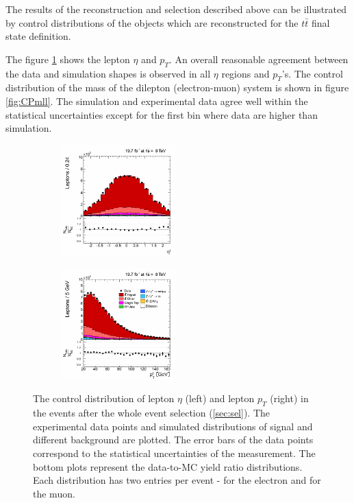 The results of the reconstruction and selection described above can be illustrated by control distributions of the objects which are reconstructed for the $t\bar{t}$
final state definition.

The figure \ref{fig:CPetaptLep} shows the lepton $\eta$ and $p_{T}$. An overall reasonable agreement between the data and simulation shapes is observed in all $\eta$ regions
and $p_{T}$'s. The control distribution of the mass of the dilepton (electron-muon) system is shown in figure \ref{fig:CPmll}. The simulation and experimental data
agree well within the statistical uncertainties except for the first bin where data are higher than simulation.

 \begin{figure}[h]
 \centering
 \begin{subfigure}
   \centering
   \includegraphics[width=0.49\textwidth]{04_event_reconstruction/plots/basic_lepton_eta_step7.png}
 \end{subfigure}
 \begin{subfigure}
   \centering
   \includegraphics[width=0.49\textwidth]{04_event_reconstruction/plots/basic_lepton_pt_step7.png}
 \end{subfigure}
 \caption{The control distribution of lepton $\eta$ (left) and lepton $p_{T}$ (right) in the events after the whole event selection (\ref{sec:sel}). 
 The experimental data points and simulated distributions of signal and different background are plotted. The error bars of the data points
 correspond to the statistical uncertainties of the measurement. The bottom plots represent the data-to-MC yield ratio distributions. 
 Each distribution has two entries per event - for the electron and for the muon.}
 \label{fig:CPetaptLep}
 \end{figure}
 
